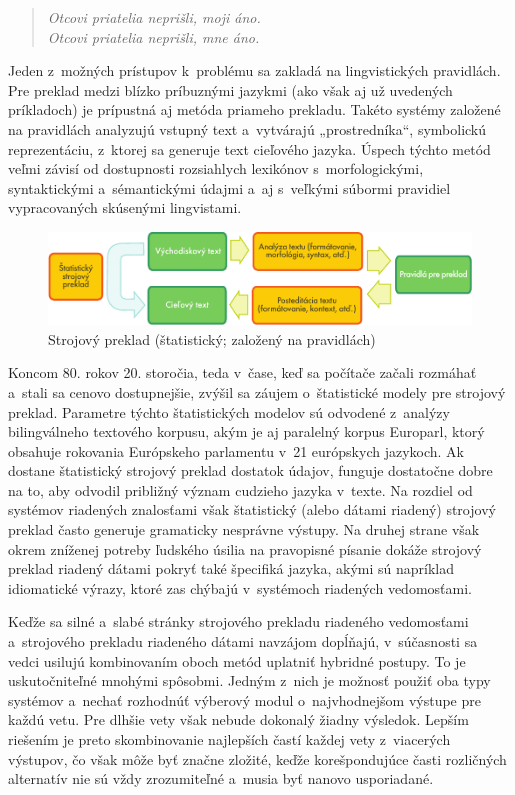 \begin{multicols}{2}
\begin{verse}
{\em Otcovi priatelia neprišli, moji áno.}\\
\smallskip
{\em Otcovi priatelia neprišli, mne áno.}
\end{verse}

Jeden z~možných prístupov k~problému sa zakladá na lingvistických
pravidlách. Pre preklad medzi blízko príbuznými jazykmi (ako však aj
už uvedených príkladoch) je prípustná aj metóda priameho prekladu.
Takéto systémy založené na pravidlách analyzujú vstupný text
a~vytvárajú „prostredníka“, symbolickú reprezentáciu, z~ktorej
sa generuje text cieľového jazyka. Úspech týchto metód veľmi
závisí od dostupnosti rozsiahlych lexikónov
s~morfologickými, syntaktickými a~sémantickými údajmi a~aj
s~veľkými súbormi  pravidiel vypracovaných
skúsenými lingvistami. 

\begin{figure}[htb]
  \center
  \includegraphics[width=\textwidth]{../_media/slovak/machine_translation}
  \caption{Strojový preklad (štatistický; založený na pravidlách)}
  \label{fig:mtarch_sk}
\end{figure}

Koncom 80. rokov 20. storočia, teda v~čase, keď sa počítače
začali rozmáhať a~stali sa cenovo dostupnejšie, zvýšil sa záujem
o~štatistické modely pre strojový preklad. Parametre týchto
štatistických modelov sú odvodené z~analýzy bilingválneho
textového korpusu, akým je aj paralelný korpus Europarl,
ktorý obsahuje rokovania Európskeho parlamentu v~21 európskych
jazykoch. Ak dostane štatistický strojový preklad dostatok údajov,
funguje dostatočne dobre na to, aby odvodil približný význam
cudzieho jazyka v~texte. Na rozdiel od systémov riadených znalosťami
však štatistický (alebo dátami riadený) strojový preklad často
generuje gramaticky nesprávne výstupy. Na druhej strane však okrem
zníženej potreby ľudského úsilia na pravopisné písanie dokáže
strojový preklad riadený dátami pokryť také špecifiká jazyka,
akými sú napríklad idiomatické výrazy, ktoré zas chýbajú
v~systémoch riadených vedomosťami. 

Keďže sa silné a~slabé stránky strojového prekladu riadeného
vedomosťami a~strojového prekladu riadeného dátami navzájom
dopĺňajú, v~súčasnosti sa vedci usilujú kombinovaním oboch metód
uplatniť hybridné postupy. To je uskutočniteľné mnohými spôsobmi.
Jedným z~nich je možnosť použiť oba typy systémov a~nechať
rozhodnúť výberový modul o~najvhodnejšom výstupe pre každú vetu.
Pre dlhšie vety však nebude dokonalý žiadny výsledok. Lepším
riešením je preto skombinovanie najlepších častí každej vety
z~viacerých výstupov, čo však môže byť značne zložité, keďže
korešpondujúce časti rozličných alternatív nie sú vždy
zrozumiteľné a~musia byť nanovo usporiadané. 


\end{multicols}
